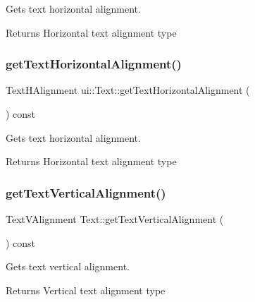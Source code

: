 Gets text horizontal alignment.

\begin{DoxyReturn}{Returns}
Horizontal text alignment type 
\end{DoxyReturn}
\mbox{\label{classui_1_1Text_af7e0397afba65e46e886acda3252bc43}} 
\subsubsection{\texorpdfstring{get\+Text\+Horizontal\+Alignment()}{getTextHorizontalAlignment()}\hspace{0.1cm}{\footnotesize\ttfamily [2/2]}}
{\footnotesize\ttfamily Text\+H\+Alignment ui\+::\+Text\+::get\+Text\+Horizontal\+Alignment (\begin{DoxyParamCaption}{ }\end{DoxyParamCaption}) const}

Gets text horizontal alignment.

\begin{DoxyReturn}{Returns}
Horizontal text alignment type 
\end{DoxyReturn}
\mbox{\label{classui_1_1Text_a06e980f114651a661c60ea2de3ec365d}} 
\subsubsection{\texorpdfstring{get\+Text\+Vertical\+Alignment()}{getTextVerticalAlignment()}\hspace{0.1cm}{\footnotesize\ttfamily [1/2]}}
{\footnotesize\ttfamily Text\+V\+Alignment Text\+::get\+Text\+Vertical\+Alignment (\begin{DoxyParamCaption}{ }\end{DoxyParamCaption}) const}

Gets text vertical alignment.

\begin{DoxyReturn}{Returns}
Vertical text alignment type 
\end{DoxyReturn}
\mbox{\label{classui_1_1Text_a757828259333ef13e7e94037a065c6c8}} 
